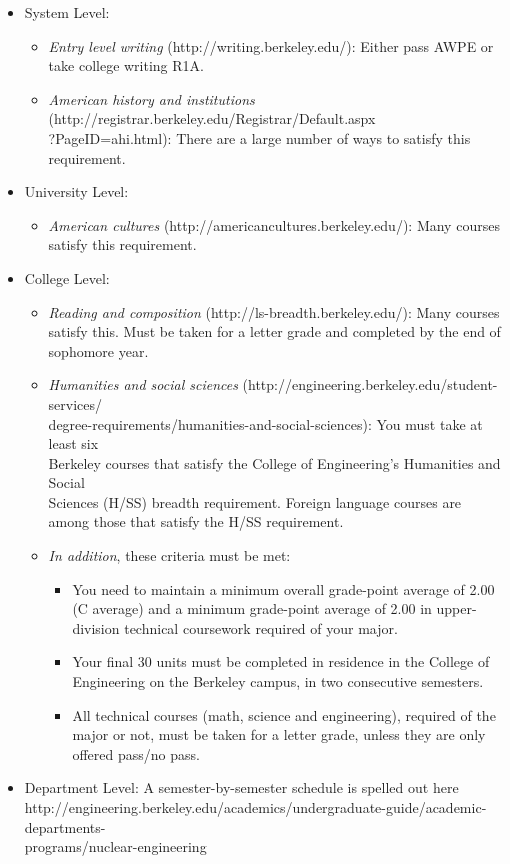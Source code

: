 \documentclass[12pt]{article}
\begin{document}
\begin{itemize}
\item System Level:
  \begin{itemize}
  \item \textit{Entry level writing} (http://writing.berkeley.edu/): Either pass AWPE or take college writing R1A.
  \item \textit{American history and institutions} (http://registrar.berkeley.edu/Registrar/Default.aspx\\?PageID=ahi.html): There are a large number of ways to satisfy this requirement.
  \end{itemize}
%
\item University Level:
  \begin{itemize}
  \item \textit{American cultures} (http://americancultures.berkeley.edu/): Many courses satisfy this requirement. 
  \end{itemize}  
%
\item College Level:
  \begin{itemize}
  \item \textit{Reading and composition} (http://ls-breadth.berkeley.edu/): Many courses satisfy this. Must be taken for a letter grade and completed by the end of sophomore year. 
  \item \textit{Humanities and social sciences} (http://engineering.berkeley.edu/student-services/\\degree-requirements/humanities-and-social-sciences): You must take at least six \\Berkeley courses that satisfy the College of Engineering’s Humanities and Social \\Sciences (H/SS) breadth requirement. Foreign language courses are among those that satisfy the H/SS requirement.
  \item \textit{In addition}, these criteria must be met:
    \begin{itemize}
    \item You need to maintain a minimum overall grade-point average of 2.00 (C average) and a minimum grade-point average of 2.00 in upper-division technical coursework required of your major.
    \item Your final 30 units must be completed in residence in the College of Engineering on the Berkeley campus, in two consecutive semesters.
    \item All technical courses (math, science and engineering), required of the major or not, must be taken for a letter grade, unless they are only offered pass/no pass.
    \end{itemize}
  \end{itemize}  
%
\item Department Level: A semester-by-semester schedule is spelled out here \\ http://engineering.berkeley.edu/academics/undergraduate-guide/academic-departments-\\programs/nuclear-engineering
   
\end{itemize}
\end{document}
